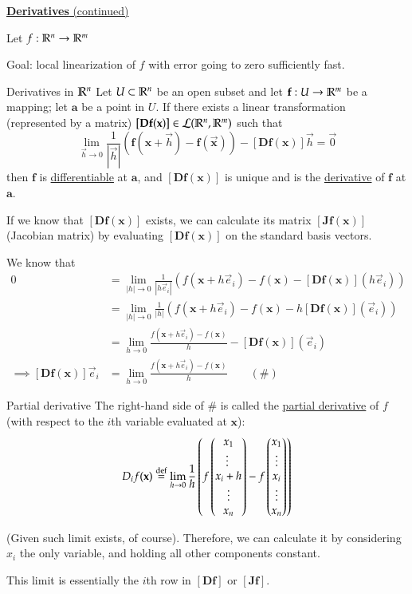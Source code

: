 
\ul{\textbf{Derivatives} (continued)}

Let $f : \mathbb{R}^n \rightarrow \mathbb{R}^m$

Goal: local linearization of $f$ with error going to zero sufficiently fast.

\begin{defn}{Derivatives in $\mathbb{R}^n$}
Let $U\subset \mathbb{R}^n$ be an open subset and let $\textbf{f} : U \to \mathbb{R}^m$ be a mapping; let $\bm{a}$ be a point in $U$. If there exists a linear transformation (represented by a matrix) $[\textbf{Df}(\textbf{x})] \in\mathcal{L}(\mathbb{R}^n, \mathbb{R}^m)$ such that
\[\lim_{\vec{h}\rightarrow 0}\frac{1}{|\vec{h}|}(\bm{f}(\bm{x}+\vec{h})-\bm{f}(\vec{\bm{x}}))-[\bm{Df}(\bm{x})]\vec{h}=\vec{0}\]
then $\bm{f}$ is \ul{differentiable} at $\bm{a}$, and $[\bm{Df}(\bm{x})]$ is unique and is the \ul{derivative} of $\bm{f}$ at $\bm{a}$. 
\end{defn}

If we know that $[\bm{Df}(\bm{x})]$ exists, we can calculate its matrix $[\bm{Jf}(\bm{x})]$ (Jacobian matrix) by evaluating $[\bm{Df}(\bm{x})]$ on the standard basis vectors.

We know that
\begin{align*}
0 &= \lim_{|h|\rightarrow 0}\frac{1}{|h\vec{e}_i|}\left( f(\bm{x}+h\vec{e}_i)-f(\bm{x})-[\bm{Df}(\bm{x})](h\vec{e}_i) \right) \\
&= \lim_{|h|\rightarrow 0}\frac{1}{|h|}\left( f(\bm{x}+h\vec{e}_i)-f(\bm{x})-h[\bm{Df}(\bm{x})](\vec{e}_i)\right) \\
&= \lim_{h\rightarrow 0}\frac{f(\bm{x}+h\vec{e}_i)-f(\bm{x})}{h} -[\bm{Df}(\bm{x})](\vec{e}_i) \\
\implies [\bm{Df}(\bm{x})]\vec{e}_i &= \lim_{h\rightarrow 0}\frac{f(\bm{x}+h\vec{e}_i)-f(\bm{x})}{h}\qquad (\#)
\end{align*}


\begin{defn}{Partial derivative}
The right-hand side of $\#$ is called the \ul{partial derivative} of $f$ (with respect to the $i$th variable evaluated at $\bm{x}$): 
\[D_i f(\textbf{x})\overset{\mathrm{def}}{=}\lim_{h\rightarrow 0}\frac{1}{h} \left(f\begin{pmatrix} x_1  \\ \vdots\ \\ x_i + h \\ \vdots \\ x_n \end{pmatrix} - f\begin{pmatrix} x_1 \\ \vdots \\ x_i \\ \vdots \\ x_n \end{pmatrix}\right)\]

(Given such limit exists, of course). Therefore, we can calculate it by considering $x_i$ the only variable, and holding all other components constant.

This limit is essentially the $i$th row in $[\bm{Df}]$ or $[\bm{Jf}]$. 
\end{defn}

